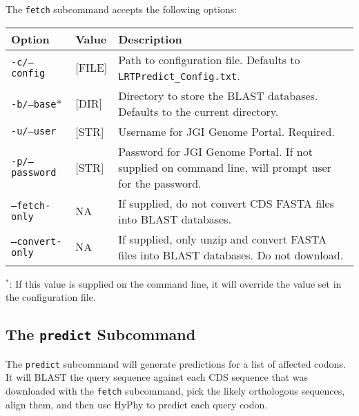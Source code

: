 \documentclass[12pt]{article}
\begin{document}
\par The \texttt{fetch} subcommand accepts the following options:
\begin{table}[H]
    \centering
    \begin{tabular}{p{105pt} l p{260pt}}
    \toprule
    Option & Value & Description \\
    \midrule
    \texttt{-c/--config} & [FILE] & Path to configuration file. Defaults to \texttt{LRTPredict\_Config.txt}. \\
    \midrule
    \texttt{-b/--base}* & [DIR] & Directory to store the BLAST databases. Defaults to the current directory.\\
    \midrule
    \texttt{-u/--user} & [STR] & Username for JGI Genome Portal. Required.\\
    \midrule
    \texttt{-p/--password} & [STR] & Password for JGI Genome Portal. If not supplied on command line, will prompt user for the password.\\
    \midrule
    \texttt{--fetch-only} & NA & If supplied, do not convert CDS FASTA files into BLAST databases.\\
    \midrule
    \texttt{--convert-only} & NA & If supplied, only unzip and convert FASTA files into BLAST databases. Do not download.\\
    \bottomrule
    \end{tabular}
\end{table}
\par $^*$: If this value is supplied on the command line, it will override
the value set in the configuration file.

\subsection*{The \texttt{predict} Subcommand}
\par The \texttt{predict} subcommand will generate predictions for a list of
affected codons. It will BLAST the query sequence against each CDS sequence
that was downloaded with the \texttt{fetch} subcommand, pick the likely
orthologous sequences, align them, and then use HyPhy to predict each query
codon.
\end{document}
